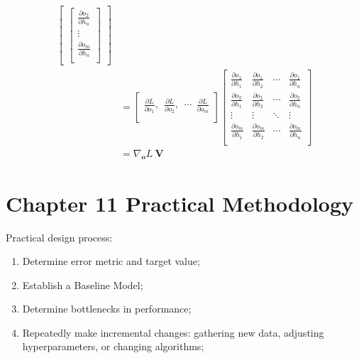 \documentclass[12pt]{article}
\numberwithin{equation}{section}
\begin{document}
\begin{align*}
\begin{bmatrix}
\begin{bmatrix}
	\frac{\partial o_2}{\partial h_n}\\
	\vdots\\
	\frac{\partial o_m}{\partial h_n}\\
	\end{bmatrix}
\end{bmatrix} \\&= 
\begin{bmatrix}
\frac{\partial L}{\partial o_1},
\ \ \frac{\partial L}{\partial o_2},
\ \ \cdots
\ \ \frac{\partial L}{\partial o_m}\\
\end{bmatrix}
\begin{bmatrix}
\frac{\partial o_{1}}{\partial h_1} & \frac{\partial o_{1}}{\partial h_2} & \cdots & \frac{\partial o_{1}}{\partial h_n}\\
\frac{\partial o_{2}}{\partial h_1} & \frac{\partial o_{2}}{\partial h_2} & \cdots & \frac{\partial o_{2}}{\partial h_n}\\
\vdots & \vdots & \ddots & \vdots\\
\frac{\partial o_{m}}{\partial h_1} & \frac{\partial o_{m}}{\partial h_2} & \cdots & \frac{\partial o_{m}}{\partial h_n}\\
\end{bmatrix} \\&= 
\nabla_{\mathbf{o}} L \ \mathbf{V}
\end{align*}
\section{Chapter 11 Practical Methodology}
Practical design process:
\begin{enumerate}
	\item Determine error metric and target value;
	\item Establish a Baseline Model;
	\item Determine bottlenecks in performance;
	\item Repeatedly make incremental changes: gathering new data, adjusting hyperparameters, or changing algorithms;
\end{enumerate}
\end{document}
